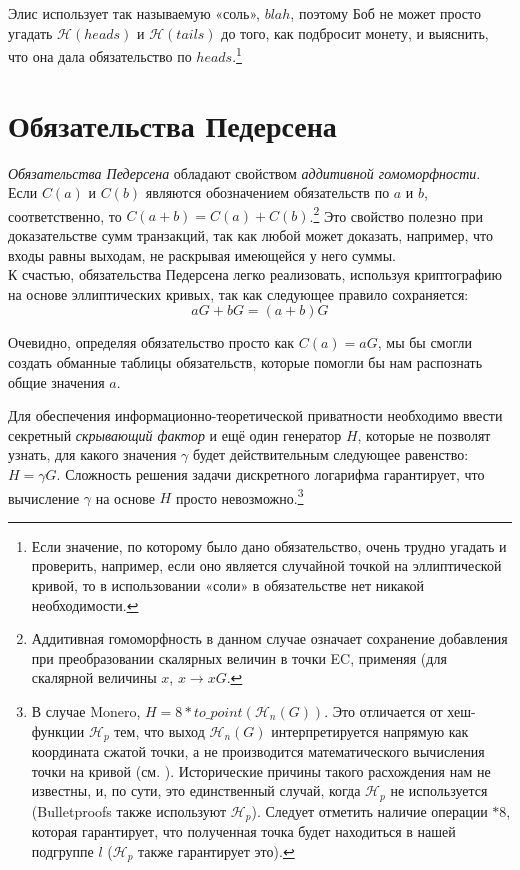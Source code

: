 Элис использует так называемую «соль», $blah$, поэтому Боб не может просто угадать $\mathcal{H}(heads)$ и $\mathcal{H}(tails)$ до того, как подбросит монету, и выяснить, что она дала обязательство по $heads$.\footnote{Если значение, по которому было дано обязательство, очень трудно угадать и проверить, например, если оно является случайной точкой на эллиптической кривой, то в использовании «соли» в обязательстве нет никакой необходимости.}



\section{Обязательства Педерсена}
\label{pedersen_section}

{\em Обязательства Педерсена} \cite{Pedersen1992} обладают свойством {\em аддитивной гомоморфности}. Если \(C(a)\) и \(C(b)\) являются обозначением обязательств по \(a\) и \(b\), соответственно, то \(C(a + b) = C(a) + C(b)\).\footnote{Аддитивная гомоморфность в данном случае означает сохранение добавления при преобразовании скалярных величин в точки EC, применяя (для скалярной величины $x$, $x \rightarrow x G$.} Это свойство полезно при доказательстве сумм транзакций, так как любой может доказать, например, что входы равны выходам, не раскрывая имеющейся у него суммы.
\\

К счастью, обязательства Педерсена легко реализовать, используя криптографию на основе эллиптических кривых, так как следующее правило сохраняется: \[a G + b G = (a + b) G\]

Очевидно, определяя обязательство просто как \(C(a) = a G\), мы бы смогли создать обманные таблицы обязательств, которые помогли бы нам распознать общие значения $a$.

Для обеспечения информационно-теоретической приватности необходимо ввести секретный {\em скрывающий фактор} и ещё один генератор \(H\), которые не позволят узнать, для какого значе\-ния \(\gamma\) будет действительным следующее равенство: \(H = \gamma G\). Сложность решения задачи дискретного логарифма гарантирует, что вычисление $\gamma$ на основе $H$ просто невозможно.\footnote{В случае Monero, $H = 8*to\_point(\mathcal{H}_n(G))$. Это отличается от хеш-функции $\mathcal{H}_p$ тем, что выход $\mathcal{H}_n(G)$ интерпретируется напрямую как координата сжатой точки, а не производится математического вычисления точки на кривой (см. \cite{hashtopoint-writeup}). Исторические причины такого расхождения нам не известны, и, по сути, это единственный случай, когда $\mathcal{H}_p$ не используется (Bulletproofs также используют $\mathcal{H}_p$). Следует отметить наличие операции $*8$, которая гарантирует, что полученная точка будет находиться в нашей подгруппе $l$ ($\mathcal{H}_p$ также гарантирует это).}

